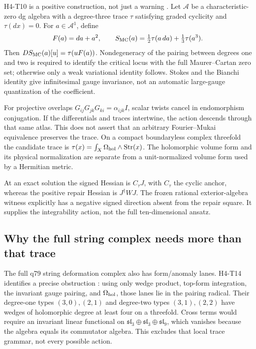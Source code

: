 \documentclass[11pt]{article}
\begin{document}
H4-T10 is a positive construction, not just a warning \cite{FrozenMC}.
Let $\mathcal A$ be a characteristic-zero dg algebra with a degree-three
trace $\tau$ satisfying graded cyclicity and $\tau(dx)=0$. For
$a\in\mathcal A^1$, define
\[
 F(a)=da+a^2,\qquad
 S_{\rm MC}(a)=\tfrac12\tau(a\,da)+\tfrac13\tau(a^3).
\]
Then $DS_{\rm MC}(a)[u]=\tau(uF(a))$. Nondegeneracy of the pairing
between degrees one and two is required to identify the critical locus
with the full Maurer--Cartan zero set; otherwise only a weak variational
identity follows. Stokes and the Bianchi identity give infinitesimal gauge
invariance, not an automatic large-gauge quantization of the coefficient.

For projective overlaps $G_{ij}G_{jk}G_{ki}=\alpha_{ijk}I$, scalar twists
cancel in endomorphism conjugation. If the differentials and traces
intertwine, the action descends through that same atlas. This does not
assert that an arbitrary Fourier--Mukai equivalence preserves the trace.
On a compact boundaryless complex threefold the candidate trace is
$\tau(x)=\int_X\Omega_{\rm hol}\wedge\operatorname{Str}(x)$.
The holomorphic volume form and its physical normalization are separate
from a unit-normalized volume form used by a Hermitian metric.

At an exact solution the signed Hessian is $C_\tau J$, with $C_\tau$
the cyclic anchor, whereas the positive repair Hessian is $J^\dagger WJ$.
The frozen rational exterior-algebra witness explicitly has a negative
signed direction absent from the repair square. It supplies the
integrability action, not the full ten-dimensional ansatz.

\subsection{Why the full string complex needs more than that trace}
\label{sec:string-cotangent}

The full q79 string deformation complex also has form/anomaly lanes.
H4-T14 identifies a precise obstruction \cite{FrozenCotangent}: using
only wedge product, top-form integration, the invariant gauge pairing,
and $\Omega_{\rm hol}$, those lanes lie in the pairing radical. Their
degree-one types $(3,0),(2,1)$ and degree-two types $(3,1),(2,2)$ have
wedges of holomorphic degree at least four on a threefold. Cross terms
would require an invariant linear functional on
$\mathfrak{sl}_3\oplus\mathfrak{sl}_3\oplus\mathfrak{sl}_9$, which
vanishes because the algebra equals its commutator algebra. This excludes
that local trace grammar, not every possible action.
\end{document}
